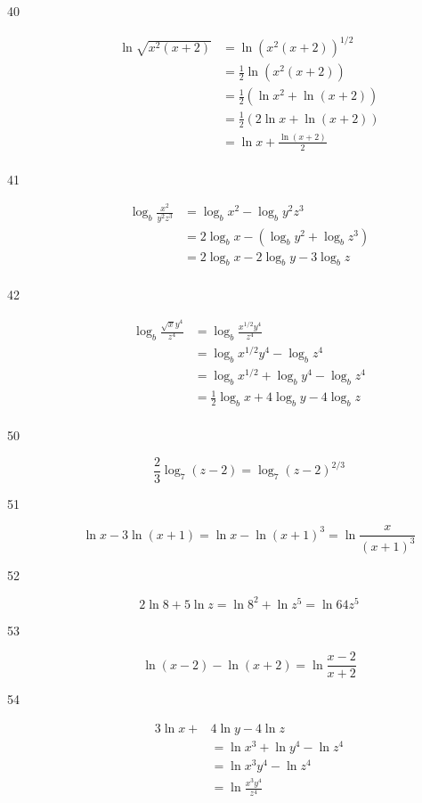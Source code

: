 \documentclass[fleqn,addpoints]{exam}
\begin{document}
\begin{description}
\item[40]
\begin{align*}
  \ln \sqrt{x^2(x+2)} &= \ln (x^2(x+2))^{1/2} \\ 
  &= \frac{1}{2} \ln (x^2(x+2)) \\ 
  &= \frac{1}{2} (\ln x^2 + \ln(x+2) ) \\ 
  &= \frac{1}{2} (2 \ln x + \ln(x+2) ) \\ 
  &= \ln x + \frac{\ln(x+2)}{2} \\ 
\end{align*}

\item[41]
\begin{align*}
  \log_b \frac{x^2}{y^2z^3} &= \log_b x^2 - \log_b y^2z^3 \\
  &= 2 \log_b x - (\log_b y^2 + \log_b z^3) \\
  &= 2 \log_b x - 2 \log_b y - 3 \log_b z \\
\end{align*}

\item[42]
\begin{align*}
  \log_b \frac{\sqrt{x} y^4}{z^4} &= \log_b \frac{x^{1/2} y^4}{z^4} \\
  &= \log_b x^{1/2} y^4 - \log_b z^4 \\
  &= \log_b x^{1/2} + \log_b y^4 - \log_b z^4 \\
  &= \frac{1}{2} \log_b x + 4 \log_b y - 4 \log_b z \\
\end{align*}

\item[50]
\[
  \frac{2}{3} \log_7(z-2) = \log_7(z-2)^{2/3}
\]

\item[51]
\[
  \ln x - 3 \ln(x+1) =   \ln x - \ln(x+1)^3 = \ln \frac{x}{(x+1)^3}
\]

\item[52]
\[
  2 \ln 8 + 5 \ln z = \ln 8^2 + \ln z^5 = \ln 64z^5
\]

\item[53]
\[ 
\ln(x-2) - \ln(x+2) = \ln \frac{x-2}{x+2}
\]

\item[54]
\begin{align*}
  3 \ln x + & 4 \ln y - 4 \ln z \\
  &= \ln x^3 + \ln y^4 - \ln z^4 \\
  &= \ln x^3y^4 - \ln z^4 \\
  &= \ln \frac{x^3y^4}{z^4} \\
\end{align*}


\end{description}
\end{document}

